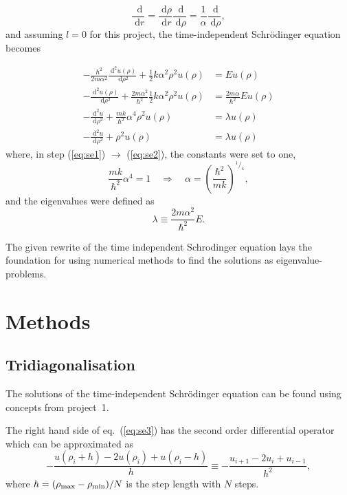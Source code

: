 \documentclass[a4paper,11pt]{article}
\newcommand{\diff}{\ensuremath{\; \text{d}}}
\begin{document}
\[ \frac{\diff}{\diff r} = \frac{\diff \rho}{\diff r} \frac{\diff}{\diff \rho} = \frac{1}{\alpha} \frac{\diff}{\diff \rho}, \]
and assuming $l=0$ for this project, the time-independent Schr\"{o}dinger equation becomes

\begin{align}
    -\frac{\hbar^2}{2m\alpha^2} \frac{\diff^2 u(\rho)}{\diff \rho^2} + \frac{1}{2} k \alpha^2 \rho^2 u(\rho) &= E u(\rho) \label{eq:se0} \\
    -\frac{\diff^2 u(\rho)}{\diff \rho^2} + \frac{2m \alpha^2}{\hbar^2}\frac{1}{2} k \alpha^2 \rho^2 u(\rho) &= \frac{2m\alpha}{\hbar^2} E u(\rho) \label{eq:se1} \\
    -\frac{\diff^2 u}{\diff \rho^2} + \frac{mk}{\hbar^2}\alpha^4 \rho^2 u(\rho) &= \lambda u(\rho) \label{eq:se2} \\
    -\frac{\diff^2 u}{\diff \rho^2} + \rho^2 u(\rho) &= \lambda u(\rho) \label{eq:se3}
\end{align}
where, in step (\ref{eq:se1}) $\to$ (\ref{eq:se2}), the constants were set to one,
\[ \frac{mk}{\hbar^2}\alpha^4 = 1 \quad \Rightarrow \quad \alpha = \left( \frac{\hbar^2}{mk}  \right)^{^1\! / _4}, \]
and the eigenvalues were defined as
\begin{equation}
    \lambda \equiv \frac{2m\alpha^2}{\hbar^2} E. 
    \label{eq:eigvals}
\end{equation}

The given rewrite of the time independent Schr{o}dinger equation lays the foundation for using numerical methods to find the solutions as eigenvalue-problems.

\section{Methods}
\subsection{Tridiagonalisation}
The solutions of the time-independent Schr\"{o}dinger equation can be found using concepts from project~1.

The right hand side of eq.~(\ref{eq:se3}) has the second order differential operator which can be approximated as
\[ -\frac{u\left( \rho_i + h \right) - 2u(\rho_i) + u\left( \rho_i - h \right)}{h} \equiv -\frac{u_{i+1} - 2u_i + u_{i-1}}{h^2}, \]
where $h = (\rho_{\rm max} - \rho_{\rm min})/N$ is the step length with $N$ steps. 
\end{document}
